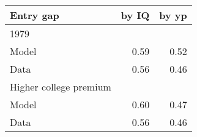 \begin{tabular}{lrr}
\hline
Entry gap & by IQ  & by yp  \\ 
\hline
1979 &   &   \\ 
Model & 0.59  & 0.52  \\ 
Data & 0.56  & 0.46  \\ 
Higher college premium &   &   \\ 
Model & 0.60  & 0.47  \\ 
Data & 0.56  & 0.46  \\ 
\hline
\end{tabular}%
